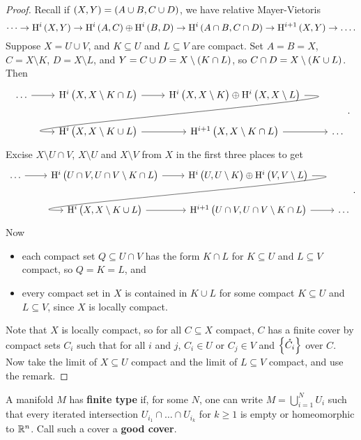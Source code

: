 \begin{proof}
Recall if $ \br{X, Y} = \br{A \cup B, C \cup D} $, we have relative Mayer-Vietoris
$$ \dots \to \H^i\br{X, Y} \to \H^i\br{A, C} \oplus \H^i\br{B, D} \to \H^i\br{A \cap B, C \cap D} \to \H^{i + 1}\br{X, Y} \to \dots. $$
Suppose $ X = U \cup V $, and $ K \subseteq U $ and $ L \subseteq V $ are compact. Set $ A = B = X $, $ C = X \setminus K $, $ D = X \setminus L $, and $ Y = C \cup D = X \setminus \br{K \cap L} $, so $ C \cap D = X \setminus \br{K \cup L} $. Then
$$
\begin{tikzcd}
\dots \arrow{r} & \H^i\br{X, X \setminus K \cap L} \arrow{r} & \H^i\br{X, X \setminus K} \oplus \H^i\br{X, X \setminus L} \arrow[in=180, out=0, overlay]{dl} & \\
& \H^i\br{X, X \setminus K \cup L} \arrow{r} & \H^{i + 1}\br{X, X \setminus K \cap L} \arrow{r} & \dots
\end{tikzcd}.
$$
Excise $ X \setminus U \cap V $, $ X \setminus U $ and $ X \setminus V $ from $ X $ in the first three places to get
$$
\begin{tikzcd}
\dots \arrow{r} & \H^i\br{U \cap V, U \cap V \setminus K \cap L} \arrow{r} & \H^i\br{U, U \setminus K} \oplus \H^i\br{V, V \setminus L} \arrow[in=180, out=-0, overlay]{dl} & \\
& \H^i\br{X, X \setminus K \cup L} \arrow{r} & \H^{i + 1}\br{U \cap V, U \cap V \setminus K \cap L} \arrow{r} & \dots
\end{tikzcd}.
$$
Now
\begin{itemize}
\item each compact set $ Q \subseteq U \cap V $ has the form $ K \cap L $ for $ K \subseteq U $ and $ L \subseteq V $ compact, so $ Q = K = L $, and
\item every compact set in $ X $ is contained in $ K \cup L $ for some compact $ K \subseteq U $ and $ L \subseteq V $, since $ X $ is locally compact.
\end{itemize}
Note that $ X $ is locally compact, so for all $ C \subseteq X $ compact, $ C $ has a finite cover by compact sets $ C_i $ such that for all $ i $ and $ j $, $ C_i \in U $ or $ C_j \in V $ and $ \cbr{\mathring{C_i}} $ over $ C $. Now take the limit of $ X \subseteq U $ compact and the limit of $ L \subseteq V $ compact, and use the remark.
\end{proof}

\begin{definition*}
A manifold $ M $ has \textbf{finite type} if, for some $ N $, one can write $ M = \bigcup_{i = 1}^N U_i $ such that every iterated intersection $ U_{i_1} \cap \dots \cap U_{i_k} $ for $ k \ge 1 $ is empty or homeomorphic to $ \mathbb{R}^n $. Call such a cover a \textbf{good cover}.
\end{definition*}

